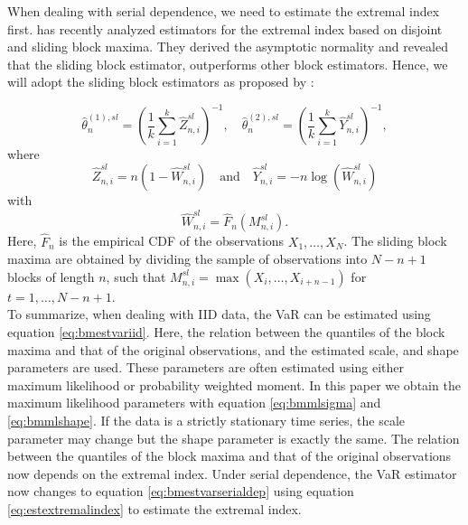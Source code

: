 \documentclass[a4paper,12pt]{article}
\theoremstyle{plain}
\begin{document}
When dealing with serial dependence, we need to estimate the extremal index first.  has recently analyzed estimators for the extremal index based on disjoint and sliding block maxima. They derived the asymptotic normality and revealed that the sliding block estimator, outperforms other block estimators. Hence, we will adopt the sliding block estimators as proposed by :

\begin{equation}
    \hat{\theta}^{(1),sl}_n=\left(\frac{1}{k}\sum^{k}_{i=1}\hat{Z}^{sl}_{n,i}\right)^{-1}, \quad \hat{\theta}^{(2),sl}_n=\left(\frac{1}{k}\sum^{k}_{i=1}\hat{Y}^{sl}_{n,i}\right)^{-1},
    \label{eq:estextremalindex}
\end{equation}
where 
\begin{equation*}
    \hat{Z}^{sl}_{n,i}=n\left(1-\hat{W}^{sl}_{n,i}\right) \quad \text{and} \quad \hat{Y}^{sl}_{n,i}=-n\log\left(\hat{W}^{sl}_{n,i}\right)
\end{equation*}
with
\begin{equation*}
    \hat{W}^{sl}_{n,i}=\hat{F}_n\left(M^{sl}_{n,i}\right).
\end{equation*}
Here, $\hat{F}_n$ is the empirical CDF of the observations $X_1, \dots, X_N$. The sliding block maxima are obtained by dividing the sample of observations into $N-n+1$ blocks of length $n$, such that $M^{sl}_{n,i}=\max\left(X_{i},\dots,X_{i+n-1}\right)$ for $t=1,\dots,N-n+1$.
\\

To summarize, when dealing with IID data, the VaR can be estimated using equation \eqref{eq:bmestvariid}. Here, the relation between the quantiles of the block maxima and that of the original observations, and the estimated scale, and shape parameters are used. These parameters are often estimated using either maximum likelihood or probability weighted moment. In this paper we obtain the maximum likelihood parameters with equation \eqref{eq:bmmlsigma} and \eqref{eq:bmmlshape}. If the data is a strictly stationary time series, the scale parameter may change but the shape parameter is exactly the same. The relation between the quantiles of the block maxima and that of the original observations now depends on the extremal index. Under serial dependence, the VaR estimator now changes to equation \eqref{eq:bmestvarserialdep} using equation \eqref{eq:estextremalindex} to estimate the extremal index.
\end{document}
